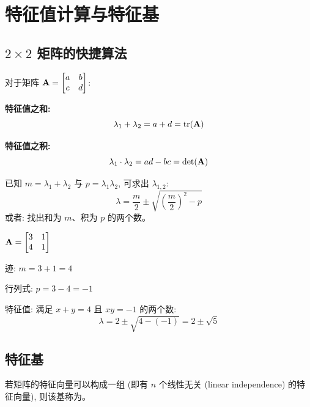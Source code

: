 
\chapter{特征值计算与特征基}
\label{ch:eigenbasis}

\begin{abstract}
在本章中, 我们将学习计算 $2 \times 2$ 矩阵特征值的快捷方法, 并熟悉特征基 (eigenbasis) 与对角化的概念。
\end{abstract}

\section{$2 \times 2$ 矩阵的快捷算法}

\begin{theorem}[快捷公式]
对于矩阵 $\mathbf{A} = \begin{bmatrix} a & b \\ c & d \end{bmatrix}$:

\textbf{特征值之和:}
\[
\lambda_1 + \lambda_2 = a + d = \operatorname{tr}(\mathbf{A})
\]

\textbf{特征值之积:}
\[
\lambda_1 \cdot \lambda_2 = ad - bc = \det(\mathbf{A})
\]
\end{theorem}

\begin{intuition}
已知 $m = \lambda_1 + \lambda_2$ 与 $p = \lambda_1 \lambda_2$, 可求出 $\lambda_{1,2}$:
\[
\lambda = \frac{m}{2} \pm \sqrt{\left(\frac{m}{2}\right)^2 - p}
\]
或者: 找出和为 $m$、积为 $p$ 的两个数。
\end{intuition}

\begin{example}
$\mathbf{A} = \begin{bmatrix} 3 & 1 \\ 4 & 1 \end{bmatrix}$

迹: $m = 3 + 1 = 4$

行列式: $p = 3 - 4 = -1$

特征值: 满足 $x + y = 4$ 且 $xy = -1$ 的两个数:
\[
\lambda = 2 \pm \sqrt{4 - (-1)} = 2 \pm \sqrt{5}
\]
\end{example}

\section{特征基}

\begin{definition}[特征基]
若矩阵的特征向量可以构成一组 (即有 $n$ 个线性无关 (linear independence) 的特征向量), 则该基称为。
\end{definition}

